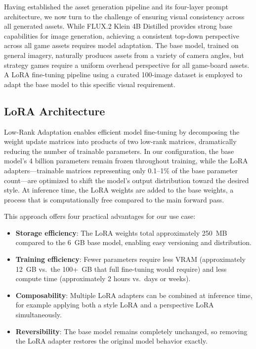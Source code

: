 \documentclass[conference]{IEEEtran}
\begin{document}
Having established the asset generation pipeline and its four-layer prompt architecture, we now turn to the challenge of ensuring visual consistency across all generated assets. While FLUX.2 Klein 4B Distilled provides strong base capabilities for image generation, achieving a consistent top-down perspective across all game assets requires model adaptation. The base model, trained on general imagery, naturally produces assets from a variety of camera angles, but strategy games require a uniform overhead perspective for all game-board assets. A LoRA fine-tuning pipeline using a curated 100-image dataset is employed to adapt the base model to this specific visual requirement.

\subsection{LoRA Architecture}

Low-Rank Adaptation enables efficient model fine-tuning by decomposing the weight update matrices into products of two low-rank matrices, dramatically reducing the number of trainable parameters. In our configuration, the base model's 4 billion parameters remain frozen throughout training, while the LoRA adapters---trainable matrices representing only 0.1--1\% of the base parameter count---are optimized to shift the model's output distribution toward the desired style. At inference time, the LoRA weights are added to the base weights, a process that is computationally free compared to the main forward pass.

This approach offers four practical advantages for our use case:

\begin{itemize}
\item \textbf{Storage efficiency}: The LoRA weights total approximately 250~MB compared to the 6~GB base model, enabling easy versioning and distribution.
\item \textbf{Training efficiency}: Fewer parameters require less VRAM (approximately 12~GB vs.\ the 100+~GB that full fine-tuning would require) and less compute time (approximately 2 hours vs.\ days or weeks).
\item \textbf{Composability}: Multiple LoRA adapters can be combined at inference time, for example applying both a style LoRA and a perspective LoRA simultaneously.
\item \textbf{Reversibility}: The base model remains completely unchanged, so removing the LoRA adapter restores the original model behavior exactly.
\end{itemize}
\end{document}
